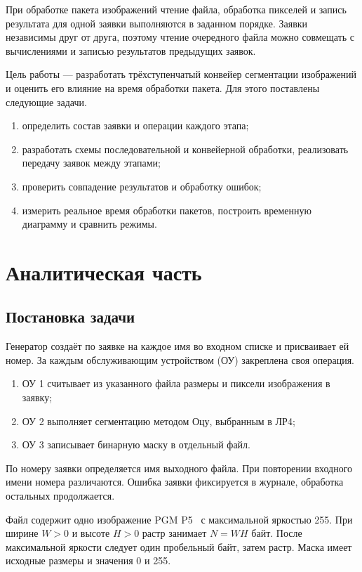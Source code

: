 При обработке пакета изображений чтение файла, обработка пикселей и запись результата для одной заявки выполняются в заданном порядке. Заявки независимы друг от друга, поэтому чтение очередного файла можно совмещать с вычислениями и записью результатов предыдущих заявок.

Цель работы --- разработать трёхступенчатый конвейер сегментации изображений и оценить его влияние на время обработки пакета. Для этого поставлены следующие задачи.
\begin{enumerate}
\item определить состав заявки и операции каждого этапа;
\item разработать схемы последовательной и конвейерной обработки, реализовать передачу заявок между этапами;
\item проверить совпадение результатов и обработку ошибок;
\item измерить реальное время обработки пакетов, построить временную диаграмму и сравнить режимы.
\end{enumerate}

\clearpage\section{Аналитическая часть}
\subsection{Постановка задачи}
Генератор создаёт по заявке на каждое имя во входном списке и присваивает ей номер. За каждым обслуживающим устройством (ОУ) закреплена своя операция.
\begin{enumerate}
\item ОУ 1 считывает из указанного файла размеры и пиксели изображения в заявку;
\item ОУ 2 выполняет сегментацию методом Оцу, выбранным в ЛР4;
\item ОУ 3 записывает бинарную маску в отдельный файл.
\end{enumerate}
По номеру заявки определяется имя выходного файла. При повторении входного имени номера различаются. Ошибка заявки фиксируется в журнале, обработка остальных продолжается.

Файл содержит одно изображение PGM P5~\cite{pgm} с максимальной яркостью 255. При ширине \(W>0\) и высоте \(H>0\) растр занимает \(N=WH\) байт. После максимальной яркости следует один пробельный байт, затем растр. Маска имеет исходные размеры и значения 0 и 255.

